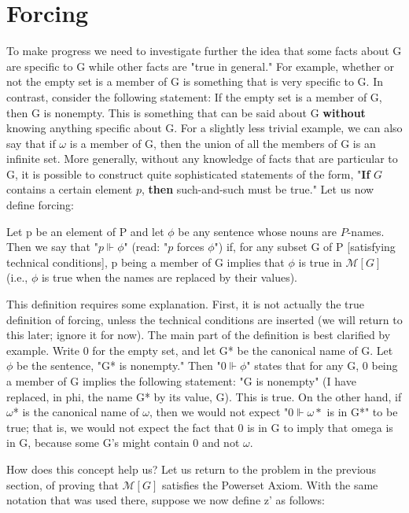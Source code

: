 \documentclass[10pt]{article}
\theoremstyle{definition}
\begin{document}
\section{Forcing}

To make progress we need to investigate further the idea that some facts
about G are specific to G while other facts are "true in general."  For
example, whether or not the empty set is a member of G is something that is
very specific to G.  In contrast, consider the following statement: If the
empty set is a member of G, then G is nonempty.  This is something that can
be said about G \textbf{without} knowing anything specific about G.  For a slightly
less trivial example, we can also say that if $\omega$ is a member of G, then
the union of all the members of G is an infinite set.  More generally,
without any knowledge of facts that are particular to G, it is possible to
construct quite sophisticated statements of the form, "\textbf{If} $G$ contains a
certain element $p$, \textbf{then} such-and-such must be true."  Let us now define
forcing:

  Let p be an element of P and let $\phi$ be any sentence
  whose nouns are $P$-names.  Then we say that "$p \Vdash \phi$"
  (read: "$p$ forces $\phi$") if, for any subset G of P
  [satisfying technical conditions], p being a member
  of G implies that $\phi$ is true in $\mathcal{M}[G]$ (i.e., $\phi$ is
  true when the names are replaced by their values).

This definition requires some explanation.  First, it is not actually the
true definition of forcing, unless the technical conditions are inserted (we
will return to this later; ignore it for now).  The main part of the
definition is best clarified by example.  Write 0 for the empty set, and let
G* be the canonical name of G.  Let $\phi$ be the sentence, "G* is nonempty."
Then "$0 \Vdash \phi$" states that for any G, 0 being a member of G implies the
following statement: "G is nonempty" (I have replaced, in phi, the name G*
by its value, G).  This is true.  On the other hand, if $\omega$* is the
canonical name of $\omega$, then we would not expect "$0 \Vdash \omega*$ is in G*" to
be true; that is, we would not expect the fact that 0 is in G to imply that
omega is in G, because some G's might contain 0 and not $\omega$.

How does this concept help us?  Let us return to the problem in the previous
section, of proving that $\mathcal{M}[G]$ satisfies the Powerset Axiom.  With the same
notation that was used there, suppose we now define z' as follows:
\end{document}
